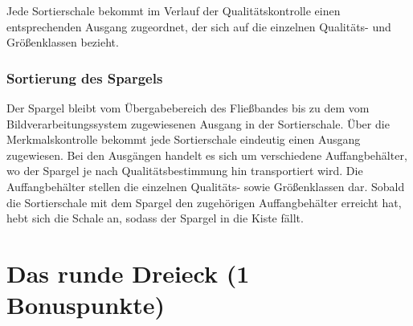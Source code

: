 \documentclass{ezb}
\begin{document}
Jede Sortierschale bekommt im Verlauf der Qualitätskontrolle einen entsprechenden Ausgang zugeordnet, der sich auf die einzelnen Qualitäts- und Größenklassen bezieht.



\subsubsection*{Sortierung des Spargels}
Der Spargel bleibt vom Übergabebereich des Fließbandes bis zu dem vom Bildverarbeitungssystem zugewiesenen Ausgang in der Sortierschale. Über die Merkmalskontrolle bekommt jede Sortierschale eindeutig einen Ausgang zugewiesen. Bei den Ausgängen handelt es sich um verschiedene Auffangbehälter, wo der Spargel je nach Qualitätsbestimmung
hin transportiert wird. Die Auffangbehälter stellen die einzelnen Qualitäts- sowie Größenklassen dar. 
Sobald die Sortierschale mit dem Spargel den zugehörigen Auffangbehälter erreicht
hat, hebt sich die Schale an, sodass der Spargel in die Kiste fällt. 

\newpage
\section{Das runde Dreieck (1 Bonuspunkte)}


\end{document}
